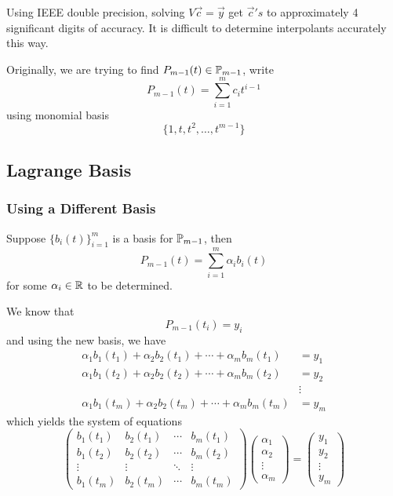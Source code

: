 Using IEEE double precision, solving \( V \vec{c} = \vec{y} \) get \( \vec{c}'s \) to approximately 4 significant digits of accuracy. It is difficult to determine interpolants accurately this way.

Originally, we are trying to find \( P_{m-1}(t) \in \P_{m-1} \), write \[
    P_{m-1}(t) = \sum_{i=1}^{m} c_i t^{i-1}
\] using monomial basis \[
    \{ 1, t, t^2, \ldots, t^{m-1} \}
\]

\subsection{Lagrange Basis}

\subsubsection{Using a Different Basis}
Suppose \( \{ b_i(t) \}_{i=1}^{m} \) is a basis for \( \P_{m-1} \), then \[
    P_{m-1}(t) = \sum_{i=1}^{m} \alpha_i b_i(t)
\] for some \( \alpha_i \in \R \) to be determined.

We know that \[
    P_{m-1}(t_i) = y_i
\] and using the new basis, we have
\begin{align*}
    \alpha_1 b_1(t_1) + \alpha_2 b_2(t_1) + \cdots + \alpha_m b_m(t_1)
     & = y_1  \\
    \alpha_1 b_1(t_2) + \alpha_2 b_2(t_2) + \cdots + \alpha_m b_m(t_2)
     & = y_2  \\
     & \vdots \\
    \alpha_1 b_1(t_m) + \alpha_2 b_2(t_m) + \cdots + \alpha_m b_m(t_m)
     & = y_m
\end{align*} which yields the system of equations \[
    \begin{pmatrix}
        b_1(t_1) & b_2(t_1) & \cdots & b_m(t_1) \\
        b_1(t_2) & b_2(t_2) & \cdots & b_m(t_2) \\
        \vdots   & \vdots   & \ddots & \vdots   \\
        b_1(t_m) & b_2(t_m) & \cdots & b_m(t_m)
    \end{pmatrix} \begin{pmatrix}
        \alpha_1 \\
        \alpha_2 \\
        \vdots   \\
        \alpha_m
    \end{pmatrix} = \begin{pmatrix}
        y_1    \\
        y_2    \\
        \vdots \\
        y_m
    \end{pmatrix}
\]

